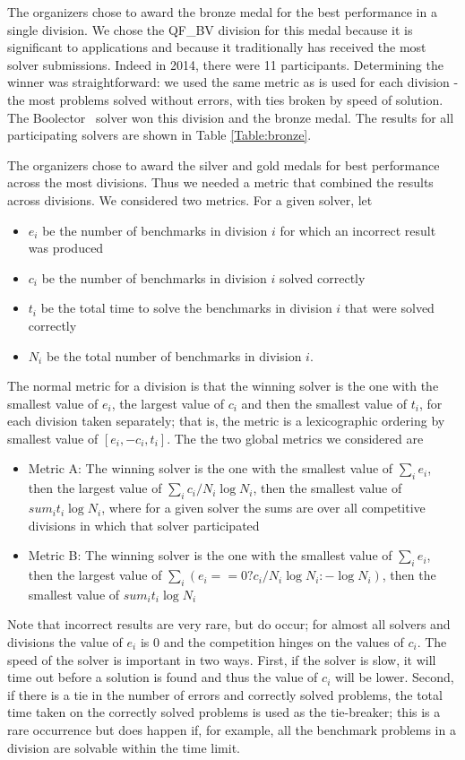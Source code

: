 \documentclass[twosize,11pt]{article}
\begin{document}
The organizers chose to award the bronze medal for the best performance in a single division. We chose  the QF\_BV division for this medal because it is significant to applications and because it traditionally has received the most solver submissions. Indeed in 2014, there were 11 participants. Determining the winner was straightforward: we used the same metric as is used for each division - the most problems solved without errors, with ties broken by speed of solution. The Boolector~\cite{boolector} solver won this division and the bronze medal. The results for all participating solvers are shown in Table \ref{Table:bronze}.

The organizers chose to award the silver and gold medals for best performance across the most divisions. Thus we needed a metric that combined the results across divisions. We considered two metrics. For a given solver, let 
\begin{itemize}
\item $e_i$ be the number of benchmarks in division $i$ for which an incorrect result was produced
\item $c_i$ be the number of benchmarks in division $i$ solved correctly
\item $t_i$ be the total time to solve the benchmarks in division $i$ that were solved correctly
\item $N_i$ be the total number of benchmarks in division $i$.
\end{itemize}
The normal metric for a division is that the winning solver is the one with the
smallest value of $e_i$, the largest value of $c_i$ and then the smallest value of $t_i$, for each division taken separately; that is, the metric is a lexicographic ordering by smallest value of $[ e_i, -c_i, t_i ]$.
The the two global metrics we considered are
\begin{itemize}
\item Metric A: The winning solver is the one with the smallest value of $\sum_i e_i$, then the largest value of $\sum_i c_i/N_i \log N_i$, then the smallest value of $sum_i t_i \log N_i$, where for a given solver the sums are over all competitive divisions in which that solver participated
\item Metric B: The winning solver is the one with the smallest value of $\sum_i e_i$, then the largest value of $\sum_i (e_i == 0 ? c_i/N_i \log N_i : - \log N_i )$, then the smallest value of $sum_i t_i \log N_i$ 
\end{itemize}
Note that incorrect results are very rare, but do occur; for almost all solvers and divisions the value of $e_i$ is 0 and the competition hinges on the values of $c_i$. The speed of the solver is important in two ways. First, if the solver is slow, it will time out before a solution is found and thus the value of $c_i$ will be lower. Second, if there is a tie in the number of errors and correctly solved problems, the total time taken on the correctly solved problems is used as the tie-breaker; this is a rare occurrence but does happen if, for example, all the benchmark problems in a division are solvable within the time limit.
\end{document}
